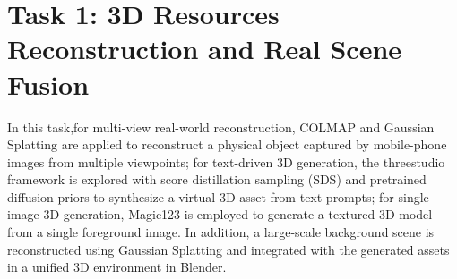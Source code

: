 \section{Task 1: 3D Resources Reconstruction and Real Scene Fusion}

In this task,for multi-view real-world reconstruction, COLMAP and Gaussian Splatting are applied to reconstruct a physical object captured by mobile-phone images from multiple viewpoints; for text-driven 3D generation, the threestudio framework is explored with score distillation sampling (SDS) and pretrained diffusion priors to synthesize a virtual 3D asset from text prompts; for single-image 3D generation, Magic123 is employed to generate a textured 3D model from a single foreground image. In addition, a large-scale background scene is reconstructed using Gaussian Splatting and integrated with the generated assets in a unified 3D environment in Blender.









